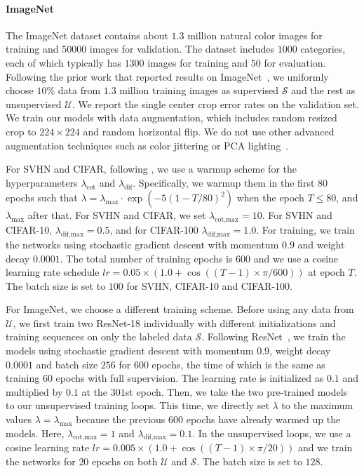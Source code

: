 \documentclass[runningheads]{llncs}
\begin{document}
\paragraph{ImageNet}
The ImageNet dataset contains about $1.3$ million natural color images for training and $50000$ images for validation.
The dataset includes $1000$ categories, each of which typically has $1300$ images for training and $50$ for evaluation.
Following the prior work that reported results on ImageNet~\cite{stoc_trans,vae,mean}, we uniformly choose $10\%$ data from $1.3$ million training images as supervised $\mathcal{S}$ and the rest as unsupervised $\mathcal{U}$.
We report the single center crop error rates on the validation set.
We train our models with data augmentation, which includes random resized crop to $224\times 224$ and random horizontal flip.
We do not use other advanced augmentation techniques such as color jittering or PCA lighting~\cite{alexnet}.

For SVHN and CIFAR, following \cite{tessl}, we use a warmup scheme for the hyperparameters $\lambda_{\text{cot}}$ and $\lambda_{\text{dif}}$.
Specifically, we warmup them in the first $80$ epochs such that $\lambda = \lambda_{\text{max}}\cdot \exp(-5 ( 1 -  T / 80) ^ 2)$ when the epoch $T\leq 80$, and $\lambda_{\text{max}}$ after that.
For SVHN and CIFAR, we set $\lambda_{\text{cot,max}}=10$.
For SVHN and CIFAR-10, $\lambda_{\text{dif,max}}=0.5$, and for CIFAR-100 $\lambda_{\text{dif,max}}=1.0$.
For training, we train the networks using stochastic gradient descent with momentum $0.9$ and weight decay $0.0001$.
The total number of training epochs is $600$ and we use a cosine learning rate schedule $lr =  0.05 \times (1.0 + \cos((T - 1) \times \pi / 600))$ at epoch $T$.
The batch size is set to $100$ for SVHN, CIFAR-10 and CIFAR-100.

For ImageNet, we choose a different training scheme.
Before using any data from $\mathcal{U}$, we first train two ResNet-18 individually with different initializations and training sequences on only the labeled data $\mathcal{S}$.
Following ResNet~\cite{resnet}, we train the models using stochastic gradient descent with momentum $0.9$, weight decay $0.0001$ and batch size $256$ for $600$ epochs, the time of which is the same as training $60$ epochs with full supervision.
The learning rate is initialized as $0.1$ and multiplied by $0.1$ at the $301$st epoch.
Then, we take the two pre-trained models to our unsupervised training loops.
This time, we directly set $\lambda$ to the maximum values $\lambda = \lambda_{\text{max}}$ because the previous $600$ epochs have already warmed up the models.
Here, $\lambda_{\text{cot,max}}=1$ and $\lambda_{\text{dif,max}}=0.1$.
In the unsupervised loops, we use a cosine learning rate $lr = 0.005 \times (1.0 + \cos((T - 1) \times \pi / 20))$ and we train the networks for $20$ epochs on both $\mathcal{U}$ and $\mathcal{S}$.
The batch size is set to $128$.
\end{document}

